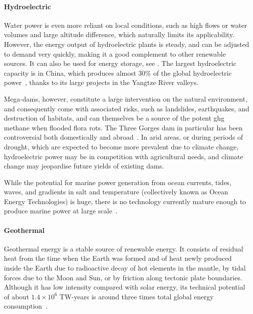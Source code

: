 \documentclass[../SustainableHEP.tex]{subfiles}
\begin{document}
\paragraph{Hydroelectric}

Water power is even more reliant on local conditions, such as high flows or water volumes and large altitude difference, which naturally limits its applicability.  However, the energy output of hydroelectric plants is steady, and can be adjusted to demand very quickly, making it a good complement to other renewable sources. It can also be used for energy storage, see . The largest hydroelectric capacity is in China, which produces almost 30\% of the global hydroelectric power~\cite{IHA2021}, thanks to its large projects in the Yangtze River valleys.

Mega-dams, however, constitute a large intervention on the natural environment, and consequently come with associated risks, such as landslides, earthquakes, and destruction of habitats, and can themselves be a source of the potent \acrshort{ghg} methane when flooded flora rots. The Three Gorges dam in particular has been controversial both domestically and abroad~\cite{ThreeGorges}. In arid areas, or during periods of drought, which are expected to become more prevalent due to climate change, hydroelectric power may be in competition with agricultural needs, and climate change may jeopardise future yields of existing dams.

While the potential for marine power generation from ocean currents, tides, waves, and gradients in salt and temperature (collectively known as Ocean Energy Technologies) is huge, there is no technology currently mature enough to produce marine power at large scale~\cite{OET}.

\paragraph{Geothermal}

Geothermal energy is a stable source of renewable energy. It consists of residual heat from the time when the Earth was formed and of heat newly produced inside the Earth due to radioactive decay of hot elements in the mantle, by tidal forces due to the Moon and Sun, or by friction along tectonic plate boundaries. Although it has low intensity compared with solar energy, its technical potential of about $1.4 \times10^6$ TW-years is around three times total global energy consumption~\cite{Britannica}.
\end{document}
